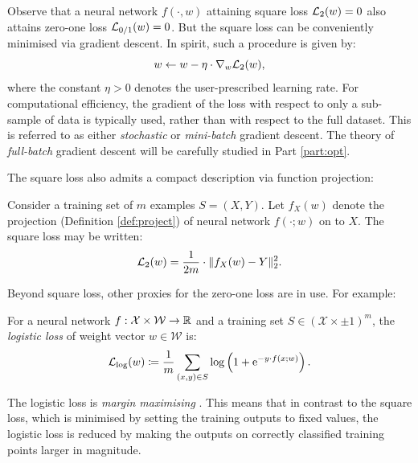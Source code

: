 \begin{refsection}
Observe that a neural network $f(\cdot,w)$ attaining square loss $\mathcal{L}_2(w) = 0$ also attains zero-one loss $\mathcal{L}_{0/1}(w)=0$. But the square loss can be conveniently minimised via gradient descent. In spirit, such a procedure is given by:
\begin{equation}
    w \gets w - \eta \cdot \nabla_w \mathcal{L}_2(w),
\end{equation}
where the constant $\eta>0$ denotes the user-prescribed learning rate. For computational efficiency, the gradient of the loss with respect to only a sub-sample of data is typically used, rather than with respect to the full dataset. This is referred to as either \textit{stochastic} or \textit{mini-batch} gradient descent. The theory of \textit{full-batch} gradient descent will be carefully studied in Part \ref{part:opt}. 

The square loss also admits a compact description via function projection:

\begin{proposition}\label{ex:sq-loss-projected} Consider a training set of $m$ examples $S=(X,Y)$. Let $f_X(w)$ denote the projection (Definition \ref{def:project}) of neural network $f(\cdot;w)$ on to $X$. The square loss may be written:
\begin{equation}\label{eq:sq-loss-projected}
    \mathcal{L}_2(w) = \frac{1}{2m}\cdot\Vert {f_X(w)-Y} \Vert_2^2.
\end{equation}
\end{proposition}

Beyond square loss, other proxies for the zero-one loss are in use. For example:

\begin{definition}\label{def:log-loss} For a neural network $f:\mathcal{X}\times\mathcal{W}\to\mathbb{R}$ and a training set $S\in(\mathcal{X}\times \pm 1)^m$, the \textit{logistic loss} of weight vector $w\in\mathcal{W}$ is:
\begin{equation}
    \mathcal{L}_{\log}(w) \coloneqq \frac{1}{m}\sum_{(x,y)\in S} \log\left(1+\mathrm{e}^{-y\cdot f(x;w)}\right).
\end{equation}
\end{definition}

The logistic loss is \textit{margin maximising} \citep{rosset2003margin}. This means that in contrast to the square loss, which is minimised by setting the training outputs to fixed values, the logistic loss is reduced by making the outputs on correctly classified training points larger in magnitude. 


\end{refsection}

